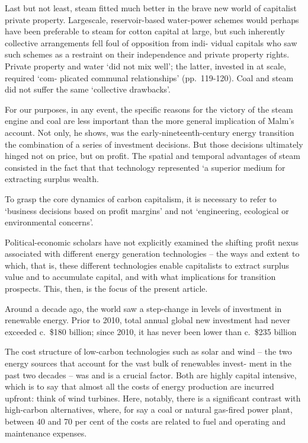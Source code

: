 \documentclass[
]{book}
\begin{document}
Last but not least, steam ﬁtted much better in the brave new world of capitalist private property.
Largescale, reservoir-based water-power schemes would perhaps have been preferable to steam for
cotton capital at large, but such inherently collective arrangements fell foul of opposition from indi-
vidual capitals who saw such schemes as a restraint on their independence and private property
rights. Private property and water `did not mix well'; the latter, invested in at scale, required `com-
plicated communal relationships' (pp.~119-120). Coal and steam did not suﬀer the same `collective
drawbacks'.

For our purposes, in any event, the speciﬁc reasons for the victory of the steam engine and coal
are less important than the more general implication of Malm's account. Not only, he shows, was the
early-nineteenth-century energy transition the combination of a series of investment decisions. But
those decisions ultimately hinged not on price, but on proﬁt. The spatial and temporal advantages of
steam consisted in the fact that that technology represented `a superior medium for extracting
surplus wealth.

To grasp the core dynamics of carbon capitalism, it is necessary to refer to
`business decisions based on proﬁt margins' and
not `engineering, ecological or environmental concerns'.

Political-economic scholars have not explicitly examined the shifting proﬁt nexus
associated with diﬀerent energy generation technologies -- the ways and extent to which, that
is, these diﬀerent technologies enable capitalists to extract surplus value and to accumulate
capital, and with what implications for transition prospects. This, then, is the focus of the
present article.

Around a decade ago, the world saw a step-change in levels of investment in renewable energy. Prior
to 2010, total annual global new investment had never exceeded c.~\$180 billion; since 2010, it has
never been lower than c.~\$235 billion

The cost structure of low-carbon technologies
such as solar and wind -- the two energy sources that account for the vast bulk of renewables invest-
ment in the past two decades -- was and is a crucial factor. Both are highly capital intensive, which is
to say that almost all the costs of energy production are incurred upfront: think of wind turbines.
Here, notably, there is a signiﬁcant contrast with high-carbon alternatives, where, for say a coal or
natural gas-ﬁred power plant, between 40 and 70 per cent of the costs are related to fuel and operating and maintenance expenses.
\end{document}

